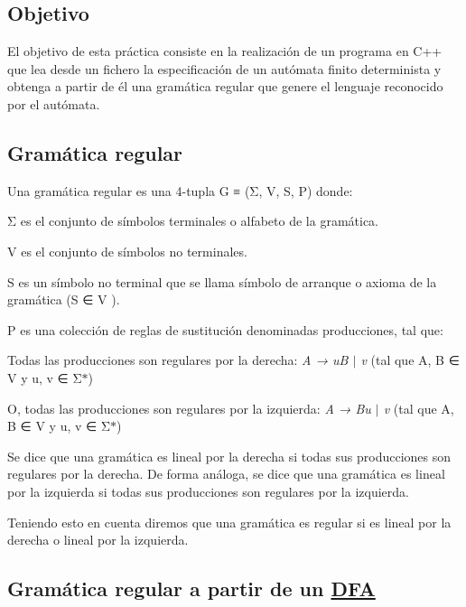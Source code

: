 \subsection*{Objetivo}

El objetivo de esta práctica consiste en la realización de un programa en C++ que lea desde un fichero la especificación de un autómata finito determinista y obtenga a partir de él una gramática regular que genere el lenguaje reconocido por el autómata.

\subsection*{Gramática regular}

Una gramática regular es una 4-\/tupla G ≡ (Σ, V, S, P) donde\+:


\begin{DoxyItemize}
\item Σ es el conjunto de símbolos terminales o alfabeto de la gramática.
\item V es el conjunto de símbolos no terminales.
\item S es un símbolo no terminal que se llama símbolo de arranque o axioma de la gramática (S ∈ V ).
\item P es una colección de reglas de sustitución denominadas producciones, tal que\+:
\begin{DoxyItemize}
\item Todas las producciones son regulares por la derecha\+: {\itshape A → uB $\vert$ v} (tal que A, B ∈ V y u, v ∈ Σ$\ast$)
\item O, todas las producciones son regulares por la izquierda\+: {\itshape A → Bu $\vert$ v} (tal que A, B ∈ V y u, v ∈ Σ$\ast$)
\end{DoxyItemize}
\end{DoxyItemize}

Se dice que una gramática es lineal por la derecha si todas sus producciones son regulares por la derecha. De forma análoga, se dice que una gramática es lineal por la izquierda si todas sus producciones son regulares por la izquierda.

Teniendo esto en cuenta diremos que una gramática es regular si es lineal por la derecha o lineal por la izquierda.

\subsection*{Gramática regular a partir de un \mbox{\hyperlink{class_d_f_a}{D\+FA}}}


